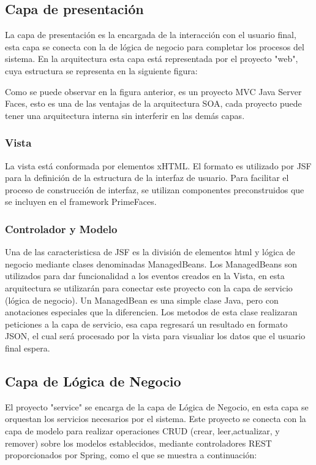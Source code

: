 \subsection {Capa de presentación}
La capa de presentación es la encargada de la interacción con el usuario final, esta capa se conecta con la de lógica de negocio para completar los procesos del sistema.
En la arquitectura esta capa está representada por el proyecto "web", cuya estructura se representa en la siguiente figura:

Como se puede observar en la figura anterior, es un proyecto MVC Java Server Faces, esto es una de las ventajas de la arquitectura SOA, cada proyecto puede tener una arquitectura interna sin interferir en las demás capas. 

\subsubsection{Vista}

La vista está conformada por elementos xHTML. El formato es utilizado por JSF para la definición de la estructura de la interfaz de usuario.
Para facilitar el proceso de construcción de interfaz, se utilizan componentes preconstruidos que se incluyen en el framework PrimeFaces.

\subsubsection{Controlador y Modelo}

Una de las caracteristicsa de JSF es la división de elementos html y lógica de negocio mediante clases denominadas ManagedBeans.
Los ManagedBeans son utilizados para dar funcionalidad a los eventos creados en la Vista, en esta arquitectura se utilizarán para conectar este proyecto con la capa de servicio (lógica de negocio).
Un ManagedBean es una simple clase Java, pero con anotaciones especiales que la diferencien. Los metodos de esta clase realizaran peticiones a la capa de servicio, esa capa regresará un resultado en formato JSON, el cual será procesado por la vista para visualiar los datos que el usuario final espera.

\subsection{Capa de Lógica de Negocio}

El proyecto "service" se encarga de la capa de Lógica de Negocio, en esta capa se orquestan los servicios necesarios por el sistema. 
Este proyecto se conecta con la capa de modelo para realizar operaciones CRUD (crear, leer,actualizar, y remover) sobre los modelos establecidos, mediante controladores REST proporcionados por Spring, como el que se muestra a continuación:


